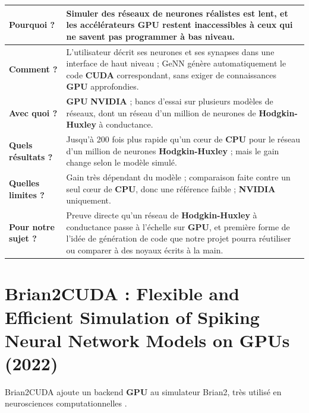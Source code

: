 \medskip
\begin{tabular}{|p{3.2cm}|p{11.2cm}|}
\hline
\textbf{Pourquoi ?} & Simuler des réseaux de neurones réalistes est lent, et les accélérateurs \textbf{GPU} restent inaccessibles à ceux qui ne savent pas programmer à bas niveau. \\ \hline
\textbf{Comment ?} & L'utilisateur décrit ses neurones et ses synapses dans une interface de haut niveau ; GeNN génère automatiquement le code \textbf{CUDA} correspondant, sans exiger de connaissances \textbf{GPU} approfondies. \\ \hline
\textbf{Avec quoi ?} & \textbf{GPU} \textbf{NVIDIA} ; bancs d'essai sur plusieurs modèles de réseaux, dont un réseau d'un million de neurones de \textbf{Hodgkin-Huxley} à conductance. \\ \hline
\textbf{Quels résultats ?} & Jusqu'à 200 fois plus rapide qu'un cœur de \textbf{CPU} pour le réseau d'un million de neurones \textbf{Hodgkin-Huxley} ; mais le gain change selon le modèle simulé. \\ \hline
\textbf{Quelles limites ?} & Gain très dépendant du modèle ; comparaison faite contre un seul cœur de \textbf{CPU}, donc une référence faible ; \textbf{NVIDIA} uniquement. \\ \hline
\textbf{Pour notre sujet ?} & Preuve directe qu'un réseau de \textbf{Hodgkin-Huxley} à conductance passe à l'échelle sur \textbf{GPU}, et première forme de l'idée de génération de code que notre projet pourra réutiliser ou comparer à des noyaux écrits à la main. \\ \hline
\end{tabular}

\section{Brian2CUDA : Flexible and Efficient Simulation of Spiking Neural Network Models on GPUs (2022)}

Brian2CUDA ajoute un backend \textbf{GPU} au simulateur Brian2, très utilisé en neurosciences computationnelles \cite{alevi2022}.

